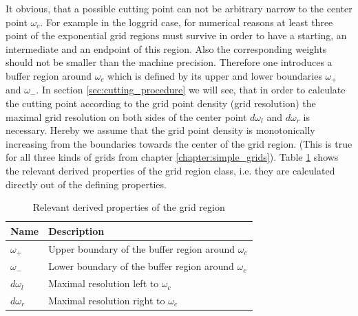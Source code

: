 It obvious, that a possible cutting point can not be arbitrary narrow to the center point $\omega_c$. For example in the loggrid case, for numerical reasons at least three point of the exponential grid regions must survive in order to have a starting, an intermediate and an endpoint of this region. Also the corresponding weights should not be smaller than the machine precision. Therefore one introduces a buffer region around $\omega_c$ which is defined by its upper and lower boundaries $\omega_+$ and $\omega_-$. In section \ref{sec:cutting_procedure} we will see, that in order to calculate the cutting point according to the grid point density (grid resolution) the maximal grid resolution on both sides of the center point $d\omega_l$ and $d\omega_r$ is necessary. Hereby we assume that the grid point density is monotonically increasing from the boundaries towards the center of the grid region. (This is true for all three kinds of grids from chapter \ref{chapter:simple_grids}). Table \ref{tab:grid_region_derived_members} shows the relevant derived properties of the grid region class, i.e. they are calculated directly out of the defining properties.
\begin{table}[h]
	\begin{center}
		\begin{tabular}{ll}
		Name & Description \\ 
		\hline
		$\omega_+$  & Upper boundary of the buffer region around $\omega_c$ \\
		$\omega_-$  & Lower boundary of the buffer region around $\omega_c$ \\
		$d\omega_l$  & Maximal resolution left to $\omega_c$ \\
		$d\omega_r$  & Maximal resolution right to $\omega_c$ \\
		\end{tabular}
	\end{center}
	\caption{Relevant derived properties of the grid region}
	\label{tab:grid_region_derived_members}
\end{table}

